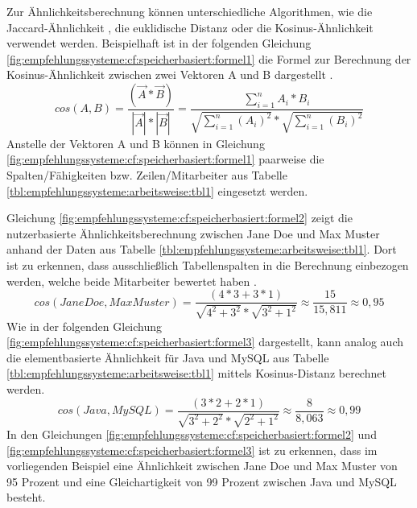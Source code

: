 Zur Ähnlichkeitsberechnung können unterschiedliche Algorithmen, wie die Jaccard-Ähnlichkeit \cite[S. 2]{bharti:2019}, die euklidische Distanz \cite[S. 3]{cheng:2013} oder die Kosinus-Ähnlichkeit \cite[S. 2]{duong:2018} verwendet werden. Beispielhaft ist in der folgenden Gleichung \ref{fig:empfehlungssysteme:cf:speicherbasiert:formel1} die Formel zur Berechnung der Kosinus-Ähnlichkeit zwischen zwei Vektoren A und B dargestellt \cite[S. 111]{bharti:2019}.
\begin{equation}
cos(A,B) = \frac{(\vec{A} * \vec{B})}{|\vec{A}| * |\vec{B}|} = \frac{\sum_{i=1}^n A_i * B_i}{\sqrt{\sum_{i=1}^n (A_i)^2} * \sqrt{\sum_{i=1}^n (B_i)^2}}
\label{fig:empfehlungssysteme:cf:speicherbasiert:formel1}
\end{equation}
Anstelle der Vektoren A und B können in Gleichung \ref{fig:empfehlungssysteme:cf:speicherbasiert:formel1} paarweise die Spalten/Fähigkeiten bzw. Zeilen/Mitarbeiter aus Tabelle \ref{tbl:empfehlungssysteme:arbeitsweise:tbl1} eingesetzt werden.

Gleichung \ref{fig:empfehlungssysteme:cf:speicherbasiert:formel2} zeigt die nutzerbasierte Ähnlichkeitsberechnung zwischen Jane Doe und Max Muster anhand der Daten aus Tabelle \ref{tbl:empfehlungssysteme:arbeitsweise:tbl1}. Dort ist zu erkennen, dass ausschließlich Tabellenspalten in die Berechnung einbezogen werden, welche beide Mitarbeiter bewertet haben \cite[S. 2f.]{hao:2013}.
\begin{equation}
	cos(Jane Doe,Max Muster) = \frac{(4*3 + 3*1)}{\sqrt{4^2 + 3^2} * \sqrt{3^2 + 1^2}} \approx \frac{15}{15,811} \approx 0,95
	\label{fig:empfehlungssysteme:cf:speicherbasiert:formel2}
\end{equation}
Wie in der folgenden Gleichung \ref{fig:empfehlungssysteme:cf:speicherbasiert:formel3} dargestellt, kann analog auch die elementbasierte Ähnlichkeit für Java und MySQL aus Tabelle \ref{tbl:empfehlungssysteme:arbeitsweise:tbl1} mittels Kosinus-Distanz berechnet werden.
\begin{equation}
	cos(Java, MySQL) = \frac{(3*2 + 2*1)}{\sqrt{3^2 + 2^2} * \sqrt{2^2 + 1^2}} \approx \frac{8}{8,063} \approx 0,99
	\label{fig:empfehlungssysteme:cf:speicherbasiert:formel3}
\end{equation}
In den Gleichungen \ref{fig:empfehlungssysteme:cf:speicherbasiert:formel2} und \ref{fig:empfehlungssysteme:cf:speicherbasiert:formel3} ist zu erkennen, dass im vorliegenden Beispiel eine Ähnlichkeit zwischen Jane Doe und Max Muster von 95 Prozent und eine Gleichartigkeit von 99 Prozent zwischen Java und MySQL besteht.%

